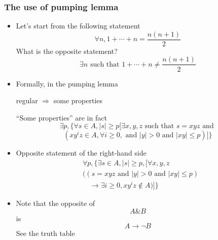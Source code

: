 \begin{frame}[allowframebreaks] \frametitle{The use of pumping lemma}
  \begin{itemize}
    
  \item Let's start from the following statement
    \begin{equation*}
      \forall n, 1 + \cdots + n = \frac{n(n+1)}{2}
    \end{equation*}
    What is the opposite statement?
    \begin{equation*}
      \exists n \text{ such that } 1 + \cdots + n \neq  \frac{n(n+1)}{2}
    \end{equation*}
    
  \item Formally, in the pumping lemma
      \begin{center}
regular $\Rightarrow$ some properties    
  \end{center}
  ``Some properties'' are in fact
  \begin{equation*}
\exists p, \{\forall s \in A, |s|\geq p [ 
\exists x,y,z \text{ such that } s = xyz \text{ and }
\end{equation*}
\begin{equation*}
(xy^iz\in A, \forall i \geq 0,
\mbox{ and }
|y| > 0
\mbox{ and }
|xy|
\leq p)]\}
\end{equation*}
\item Opposite statement of the right-hand side
 \begin{equation}
   \begin{split}
& \forall p, \{\exists s \in A, |s|\geq p, 
[\forall x,y,z 
\\
& (
(s = xyz
\text{ and }
|y| > 0
 \mbox{ and }
 |xy|
 \leq p
)
\\
& \quad \rightarrow
\exists i \geq 0, xy^iz\notin A)]\} 
\end{split}
\label{eq:oppositepumping}
 \end{equation}
\item Note that the opposite of
  \begin{equation*}
    A \& B
  \end{equation*}
is
\begin{equation*}
  A \rightarrow \neg B
\end{equation*}
See the truth table


\end{itemize}
\end{frame}
